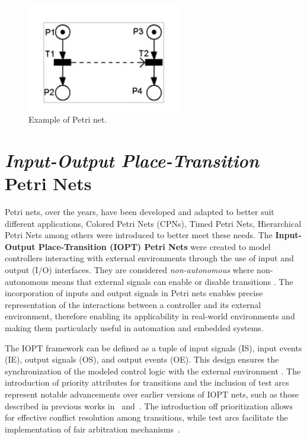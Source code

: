 \begin{figure}[htbp]
  \centering
  \includegraphics[width=0.6\textwidth]{Chapters/Figures/petrinet.jpg}
  \caption{Example of Petri net.}
  \label{fig:petrinet}
\end{figure}

\section{\emph{Input-Output Place-Transition} Petri Nets}
\label{sec:iopt_petri_nets}


Petri nets, over the years, have been developed and adapted to better suit different applications,  Colored Petri Nets (CPNs), Timed Petri Nets, Hierarchical Petri Nets among others were introduced to better meet these needs. The \textbf{Input-Output Place-Transition (IOPT) Petri Nets} were created to model controllers interacting with external environments through the use of input and output (I/O) interfaces\cite{iopttools}. They are considered \emph{non-autonomous}  where non-autonomous means that external signals can enable or disable transitions \cite{2015gomes}. The incorporation of inputs and output signals in Petri nets enables precise representation of the interactions between a controller and its external environment, therefore enabling its applicability in real-world environments  and making them particularly useful in automation and embedded systems\cite{iopttools}.


The IOPT framework can be defined as a tuple of input signals (IS), input events (IE), output signals (OS), and output events (OE). This design ensures the synchronization of the modeled control logic with the external environment \cite{iopttools}. The introduction of priority attributes for transitions and the inclusion of test arcs represent notable advancements over earlier versions of IOPT nets, such as those described in previous works in~\cite{barros2004} and~\cite{bg2005}. The introduction off prioritization allows for effective conflict resolution among transitions, while test arcs facilitate the implementation of fair arbitration mechanisms~\cite{conflict}.

